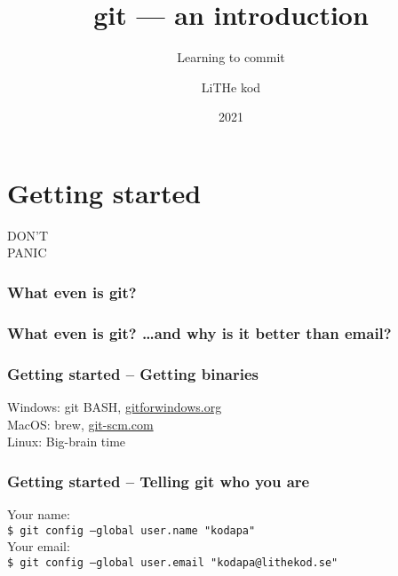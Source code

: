 \documentclass{beamer}
\title[git]{git --- an introduction}
\subtitle{Learning to commit}
\author{LiTHe kod}
\date{2021}
\begin{document}
\frame{\titlepage}
\frame{\tableofcontents}


\section{Getting started}

\begin{frame}[fragile]
  \begin{center}
  \Huge \alert{DON'T\\PANIC}
  \end{center}
\end{frame}

\begin{frame}[fragile]
  \frametitle{What even is git?}
\end{frame}

\begin{frame}[fragile]
  \frametitle{What even is git? \dots and why is it better than email?}
\end{frame}

\begin{frame}[fragile]
  \frametitle{Getting started -- Getting binaries}
  
  Windows: git BASH, \url{gitforwindows.org}\\
  MacOS: brew, \url{git-scm.com}\\
  Linux: Big-brain time\\

\end{frame}

\begin{frame}[fragile]
  \frametitle{Getting started -- Telling git who you are}

  Your name:\\
  \texttt{\$ git config --global user.name "kodapa"} \\[1em]

  Your email:\\
  \texttt{\$ git config --global user.email "kodapa@lithekod.se"} \\

\end{frame}
\end{document}
